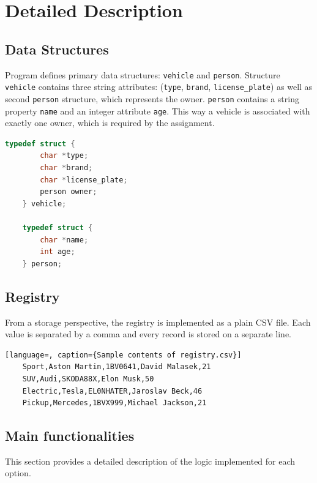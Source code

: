 \documentclass[12pt, a4paper]{article}
\begin{document}
\section{Detailed Description}

\subsection{Data Structures}

Program defines primary data structures: \texttt{vehicle} and \texttt{person}.
Structure \texttt{vehicle} contains three string attributes: (\texttt{type}, \texttt{brand}, \texttt{license\_plate}) 
as well as second \texttt{person} structure, which represents the owner.
\texttt{person} contains a string property \texttt{name} and an integer attribute \texttt{age}. 
This way a vehicle is associated with exactly one owner, which is required by the assignment.

    \begin{lstlisting}[language=C, caption={Definition of data structures}]
    typedef struct {
        char *type;
        char *brand;
        char *license_plate;
        person owner;
    } vehicle;
    
    typedef struct {
        char *name;
        int age;
    } person;
    \end{lstlisting}

\subsection{Registry}

From a storage perspective, the registry is implemented as a plain CSV file. Each value is separated by a comma and every record is stored on a separate line.

    \begin{lstlisting}[language=, caption={Sample contents of registry.csv}]
    Sport,Aston Martin,1BV0641,David Malasek,21
    SUV,Audi,SKODA88X,Elon Musk,50
    Electric,Tesla,EL0NHATER,Jaroslav Beck,46
    Pickup,Mercedes,1BVX999,Michael Jackson,21
    \end{lstlisting}

\subsection{Main functionalities}

This section provides a detailed description of the logic implemented for each option.
\end{document}
